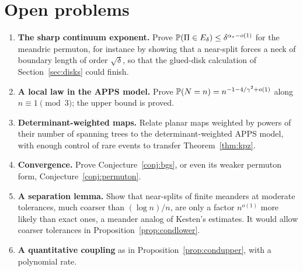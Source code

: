 \section{Open problems}\label{sec:open}

\begin{enumerate}
\item \textbf{The sharp continuum exponent.} Prove $\mathbb{P}(\Pi\in E_\delta)\le\delta^{\alpha_*-o(1)}$ for the
meandric permuton, for instance by showing that a near-split forces a neck of boundary length of
order $\sqrt\delta$, so that the glued-disk calculation of Section~\ref{sec:disks} could finish.
\item \textbf{A local law in the APPS model.} Prove $\mathbb{P}(N=n)=n^{-1-4/\gamma^2+o(1)}$ along
$n\equiv1\pmod3$; the upper bound is proved.
\item \textbf{Determinant-weighted maps.} Relate planar maps weighted by powers of their number of
spanning trees to the determinant-weighted APPS model, with enough control of rare events to
transfer Theorem~\ref{thm:kpz}.
\item \textbf{Convergence.} Prove Conjecture~\ref{conj:bgs}, or even its weaker permuton form,
Conjecture~\ref{conj:permuton}.
\item \textbf{A separation lemma.} Show that near-splits of finite meanders at moderate tolerances,
much coarser than $(\log n)/n$, are only a factor $n^{o(1)}$ more likely than exact ones, a meander
analog of Kesten's estimates. It would allow coarser tolerances in
Proposition~\ref{prop:condlower}.
\item \textbf{A quantitative coupling} as in Proposition~\ref{prop:condupper}, with a polynomial rate.
\end{enumerate}
